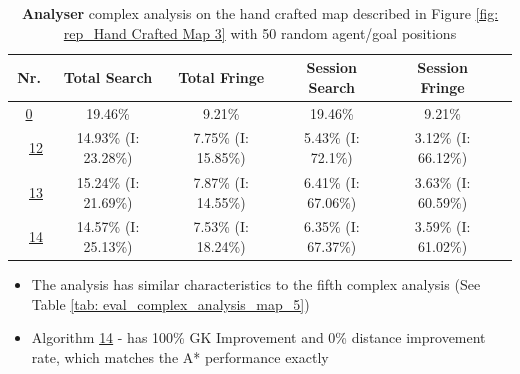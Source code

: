 \begin{table}[h!]
\bigskip

\begin{tabular}{|cc|c|c|c|c|c|}
\hline
\multicolumn{2}{|c|}{\textbf{Nr.}} & \textbf{Total Search} & \textbf{Total Fringe} & \textbf{Session Search} & \textbf{Session Fringe}\\
\hline
\hline
\multicolumn{2}{|c|}{\cellcolor{lightgray!20} \hyperref[tab: evalalgorithms]{0}} & 19.46\% & 9.21\% & 19.46\% & 9.21\%\\
\hline
\hline
\multicolumn{1}{|M{0.15cm}}{\cellcolor{cyan!40}} & \multicolumn{1}{M{0.15cm}|}{\cellcolor{blue!40} \hspace*{-0.5cm}\hyperref[tab: evalalgorithms]{12}} & 14.93\% (I: 23.28\%) & 7.75\% (I: 15.85\%) & 5.43\% (I: 72.1\%) & 3.12\% (I: 66.12\%)\\
\hline
\multicolumn{1}{|M{0.15cm}}{\cellcolor{cyan!40}} & \multicolumn{1}{M{0.15cm}|}{\cellcolor{red!40} \hspace*{-0.5cm}\hyperref[tab: evalalgorithms]{13}} & 15.24\% (I: 21.69\%) & 7.87\% (I: 14.55\%) & 6.41\% (I: 67.06\%) & 3.63\% (I: 60.59\%)\\
\hline
\multicolumn{1}{|M{0.15cm}}{\cellcolor{cyan!40}} & \multicolumn{1}{M{0.15cm}|}{\cellcolor{orange!40} \hspace*{-0.5cm}\hyperref[tab: evalalgorithms]{14}} & 14.57\% (I: 25.13\%) & 7.53\% (I: 18.24\%) & 6.35\% (I: 67.37\%) & 3.59\% (I: 61.02\%)\\
\hline
\end{tabular}


\caption{\textbf{Analyser} complex analysis on the hand crafted map described in Figure \ref{fig: rep_Hand Crafted Map 3} with 50 random agent/goal positions}
\label{tab: eval_complex_analysis_map_6} 
\end{table}

\begin{itemize}
    \item The analysis has similar characteristics to the fifth complex analysis (See Table \ref{tab: eval_complex_analysis_map_5})
    \item Algorithm \hyperref[tab: evalalgorithms]{14} - has 100\% GK Improvement and 0\% distance improvement rate, which matches the A* performance exactly
\end{itemize}

\pagebreak